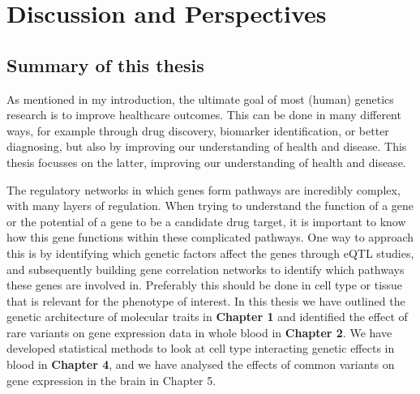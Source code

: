 \chapter{Discussion and Perspectives}
\label{chap:discussion}

{ \Large {} }

\newpage

\section{Summary of this thesis}
As mentioned in my introduction, the ultimate goal of most (human) genetics research is to improve healthcare outcomes. This can be done in many different ways, for example through drug discovery, biomarker identification, or better diagnosing, but also by improving our understanding of health and disease\cite{mcguireRoadAheadGenetics2020, claussnitzerBriefHistoryHuman2020e}. This thesis focusses on the latter, improving our understanding of health and disease. 

The regulatory networks in which genes form pathways are incredibly complex, with many layers of regulation. When trying to understand the function of a gene or the potential of a gene to be a candidate drug target, it is important to know how this gene functions within these complicated pathways. One way to approach this is by identifying which genetic factors affect the genes through eQTL studies, and subsequently building gene correlation networks to identify which pathways these genes are involved in. Preferably this should be done in cell type or tissue that is relevant for the phenotype of interest. In this thesis we have outlined the genetic architecture of molecular traits in \textbf{Chapter 1}\cite{claringbouldGeneticArchitectureMolecular2017} and identified the effect of rare variants on gene expression data in whole blood in \textbf{Chapter 2}\cite{kleinImbalancedExpressionPredicted2020}. We have developed statistical methods to look at cell type interacting genetic effects in blood in \textbf{Chapter 4}\cite{raulaguirre-gamboaDeconvolutionBulkBlood2020}, and we have analysed the effects of common variants on gene expression in the brain in Chapter 5. 


